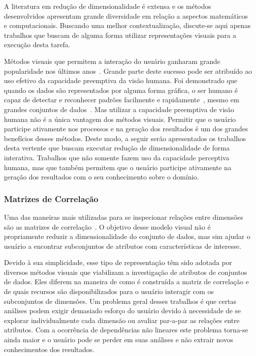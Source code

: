 A literatura em redução de dimensionalidade é extensa e os
métodos desenvolvidos apresentam grande diversidade em
relação a aspectos matemáticos e computacionais. Buscando
uma melhor contextualização, discute-se aqui apenas
trabalhos que buscam de alguma forma utilizar representações
visuais para a execução desta tarefa.

Métodos visuais que permitem a interação do usuário ganharam
grande popularidade nos últimos anos~\cite{State2012}.
Grande parte deste sucesso pode ser atribuído ao uso efetivo
da capacidade preemptiva da visão humana. Foi demonstrado
que quando os dados são representados por alguma forma
gráfica, o ser humano é capaz de detectar e reconhecer
padrões facilmente e rapidamente~\cite{Healey1995}, mesmo em
grandes conjuntos de dados~\cite{Fodor2002}. Mas utilizar a
capacidade preemptiva de visão humana não é a única vantagem
dos métodos visuais. Permitir que o usuário participe
ativamente nos processos e na geração dos resultados é um
dos grandes benefícios desses métodos. Deste
modo, a seguir serão apresentados os trabalhos desta 
vertente que buscam executar redução de dimensionalidade de
forma interativa. Trabalhos que não somente fazem uso da
capacidade perceptiva humana, mas que também permitem
que o usuário participe ativamente na geração dos resultados
com o seu conhecimento sobre o domínio.

\subsubsection{Matrizes de Correlação}\label{sss:cormat}

Uma das maneiras mais utilizadas para se inspecionar
relações entre dimensões são as matrizes de
correlação~\cite{Friendly2002}. O objetivo desse modelo
visual não é propriamente reduzir a dimensionalidade do
conjunto de dados, mas sim ajudar o usuário a encontrar
subconjuntos de atributos com características de interesse.

Devido à sua simplicidade, esse tipo de representação têm
sido adotada por diversos métodos visuais que viabilizam a
investigação de atributos de conjuntos de
dados\citet{Friendly2002,Guo2003,MacEachren2003,
RBF2004,May2011ss,Johansson2009,Ingram2010,May2011}. Eles
diferem na maneira de como é construída a matriz de
correlação e de quais recursos são disponibilizados para o
usuário interagir com os subconjuntos de dimensões. Um
problema geral desses trabalhos é que certas análises podem
exigir demasiado esforço do usuário devido à necessidade de
se explorar individualmente cada dimensão ou avaliar
par-a-par as relações entre atributos. Com a ocorrência de
dependências não lineares este problema torna-se ainda maior
e o usuário pode se perder em suas análises e não extrair
novos conhecimentos dos resultados. 

